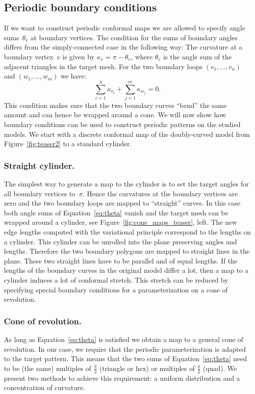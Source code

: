 \documentclass[Thesis.tex]{subfiles}
\begin{document}
\subsection{Periodic boundary conditions}
\label{sec:boundary}

If we want to construct periodic conformal maps we are allowed
to specify angle sums~$\theta_v$ at boundary vertices. The condition
for the sums of boundary angles differs from the simply-connected case in the
following way: The curvature at a boundary vertex~$v$ is given by
$\kappa_v = \pi -\theta_v$, where $\theta_v$ is the angle sum of the
adjacent triangles in the target mesh. For the two boundary loops
$(v_1, \ldots, v_n)$ and $(w_1, \ldots, w_m)$ we have:
\begin{equation}
\sum_{i=1}^n \kappa_{v_i} + \sum_{j=1}^m \kappa_{w_j} = 0. \label{eq:theta}
\end{equation}
This condition makes sure that the two boundary curves ``bend'' the
same amount and can hence be wrapped around a cone. 
We will now show how boundary conditions can be
used to construct periodic patterns on the studied models. We start
with a discrete conformal map of the doubly-curved model from Figure~\ref{fig:teaser2} 
to a standard cylinder. 

\subsubsection{Straight cylinder.}
The simplest way to generate a map to the cylinder is to set the
target angles for all boundary vertices to~$\pi$. Hence the curvatures
at the boundary vertices are zero and the two boundary loops are
mapped to ``straight'' curves. 
In this case both angle sums of Equation~\eqref{eq:theta}
vanish and the target mesh can be wrapped around a cylinder, see 
Figure~\ref{fig:cone_maps_teaser}, left. The new edge lengths
computed with the variational principle correspond to the lengths on a
cylinder. This cylinder can be unrolled into the plane preserving angles
and lengths. Therefore the two boundary polygons are mapped to straight lines
in the plane. These two straight lines have to be parallel and of
equal lengths.
%
If the lengths of the boundary curves in the original model differ a
lot, then a map to a cylinder induces a lot of conformal stretch. This stretch
can be reduced by specifying special boundary conditions for a
parameterization on a cone of revolution.

\subsubsection{Cone of revolution.}
As long as Equation~\eqref{eq:theta} is satisfied we obtain a map to a
general cone of revolution. In our case, we require that the
periodic parameterization is adapted to the target pattern. 
This means that the two sums of Equation~\eqref{eq:theta} need to 
be (the same) multiples of
$\tfrac{\pi}{3}$ (triangle or hex) or multiples of $\tfrac{\pi}{2}$
(quad). We present two methods to achieve this requirement: a uniform
distribution and a concentration of curvature.
\end{document}
